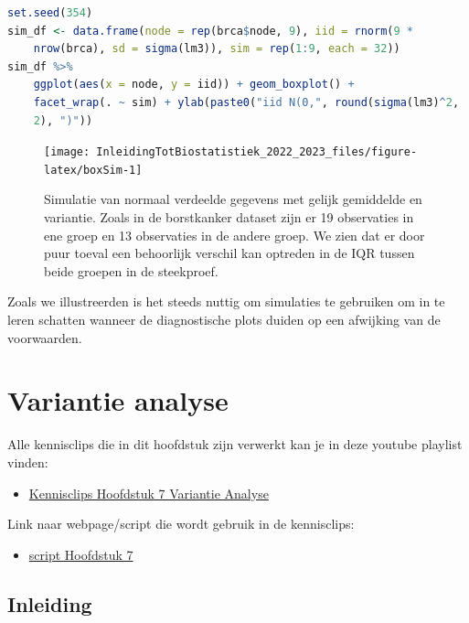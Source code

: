 \documentclass[
  12pt,dutch,coursenotes]{book}
\providecommand{\tightlist}{%
  \setlength{\itemsep}{0pt}\setlength{\parskip}{0pt}}
\begin{document}
\begin{lstlisting}[language=R]
set.seed(354)
sim_df <- data.frame(node = rep(brca$node, 9), iid = rnorm(9 *
    nrow(brca), sd = sigma(lm3)), sim = rep(1:9, each = 32))
sim_df %>%
    ggplot(aes(x = node, y = iid)) + geom_boxplot() +
    facet_wrap(. ~ sim) + ylab(paste0("iid N(0,", round(sigma(lm3)^2,
    2), ")"))
\end{lstlisting}

\begin{figure}

{\centering \texttt{[image: InleidingTotBiostatistiek\_2022\_2023\_files/figure-latex/boxSim-1]} 

}

\caption{Simulatie van normaal verdeelde gegevens met gelijk gemiddelde en variantie. Zoals in de borstkanker dataset zijn er 19 observaties in ene groep en 13 observaties in de andere groep. We zien dat er door puur toeval een behoorlijk verschil kan optreden in de IQR tussen beide groepen in de steekproef.}\label{fig:boxSim}
\end{figure}

Zoals we illustreerden is het steeds nuttig om simulaties te gebruiken om in te leren schatten wanneer de diagnostische plots duiden op een afwijking van de voorwaarden.

\hypertarget{chap-anova}{%
\chapter{Variantie analyse}\label{chap-anova}}

Alle kennisclips die in dit hoofdstuk zijn verwerkt kan je in deze youtube playlist vinden:

\begin{itemize}
\tightlist
\item
  \href{https://www.youtube.com/playlist?list=PLZH1hP8_LbJIBVGNQ61zxMgc2srezPpnB}{Kennisclips Hoofdstuk 7 Variantie Analyse}
\end{itemize}

Link naar webpage/script die wordt gebruik in de kennisclips:

\begin{itemize}
\tightlist
\item
  \href{https://statomics.github.io/sbc21/rmd/07-Anova.html}{script Hoofdstuk 7}
\end{itemize}

\hypertarget{inleiding-6}{%
\section{Inleiding}\label{inleiding-6}}
\end{document}
